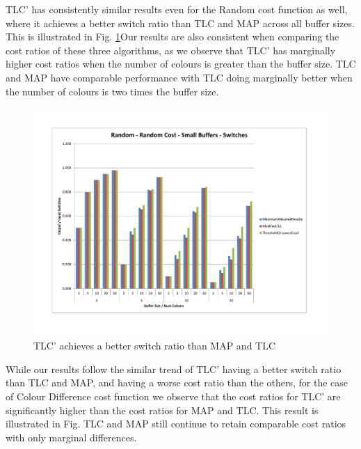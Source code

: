 TLC' has consistently similar results even for the Random cost function as well, where it achieves a better switch ratio than TLC and MAP across all buffer sizes. This is illustrated in Fig. \ref{randomRCSmallSwitches}Our results are also consistent when comparing the cost ratios of these three algorithms, as we observe that TLC' has marginally higher cost ratios when the number of colours is greater than the buffer size. TLC and MAP have comparable performance with TLC doing marginally better when the number of colours is two times the buffer size. 

\begin{figure}[ht]
\centering 
\includegraphics[scale=0.60]{Random-rc-small-switches.pdf}
\caption{TLC' achieves a better switch ratio than MAP and TLC}
\label{randomRCSmallSwitches}
\end{figure}   

While our results follow the similar trend of TLC' having a better switch ratio than TLC and MAP, and having a worse cost ratio than the others, for the case of Colour Difference cost function we observe that the cost ratios for TLC' are significantly higher than the cost ratios for MAP and TLC. This result is illustrated in Fig. TLC and MAP still continue to retain comparable cost ratios with only marginal differences. 

